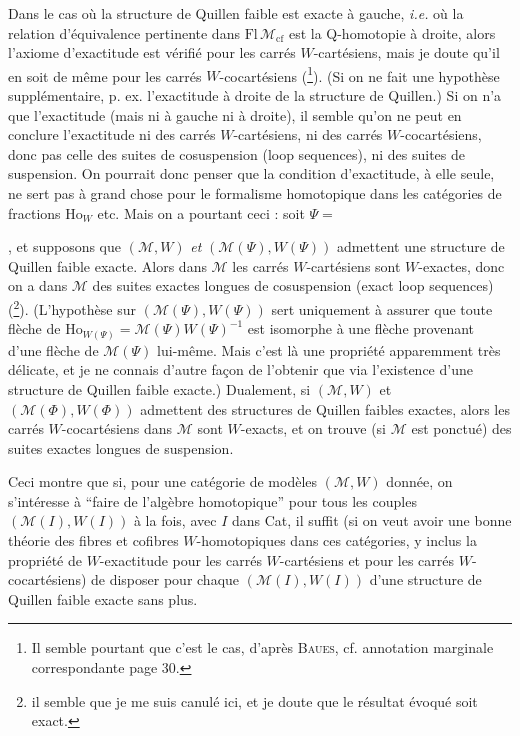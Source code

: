 \documentclass[11pt]{article}
\newcommand{\printedpage}[1]{\marginpar{\footnotesize p.~#1}}
\newcommand{\msp}[1]{\marginpar{\footnotesize [#1]}}
\newcommand{\cM}{\mathcal{M}}
\begin{document}
Dans le cas où la structure de Quillen faible est exacte à gauche, \textit{i.e.} où la relation d'équivalence pertinente dans $\mathrm{Fl}\,\cM_{\mathrm{cf}}$ est la Q-homotopie à droite, alors l'axiome d'exactitude est vérifié pour les carrés $W$-cartésiens, mais je doute qu'il en soit de même pour les carrés $W$-cocartésiens (\footnote{Il semble pourtant que c'est le cas, d'après \textsc{Baues}, cf. annotation marginale correspondante page 30.}). (Si on ne fait une hypothèse supplémentaire, p. ex. l'exactitude à droite de la structure de Quillen.) Si on n'a que l'exactitude (mais ni à gauche ni à droite), il semble qu'on ne peut en conclure l'exactitude ni des carrés $W$-cartésiens, ni des carrés $W$-cocartésiens, donc pas celle des suites de cosuspension (loop sequences), ni des suites de suspension. On pourrait donc penser que la condition d'exactitude, à elle seule, ne sert pas à grand
\msp{page 33}
chose pour le formalisme homotopique dans les catégories de fractions $\mathrm{Ho}_W$ etc. Mais on a pourtant ceci : soit $\Psi = {}$, et supposons que $(\cM,W)$ \textit{et} $(\cM(\Psi),W(\Psi))$ 
\printedpage{20}
 admettent une structure de Quillen faible exacte. Alors dans $\cM$ les carrés $W$-cartésiens sont $W$-exactes, donc on a dans $\cM$ des suites exactes longues de cosuspension (exact loop sequences) (\footnote{il semble que je me suis canulé ici, et je doute que le résultat évoqué soit exact.}). (L'hypothèse sur $(\cM(\Psi),W(\Psi))$ sert uniquement à assurer que toute flèche de $\mathrm{Ho}_{W(\Psi)} = \cM(\Psi)W(\Psi)^{-1}$ est isomorphe à une flèche provenant d'une flèche de $\cM(\Psi)$ lui-même. Mais c'est là une propriété apparemment très délicate, et je ne connais d'autre façon de l'obtenir que via l'existence d'une structure de Quillen faible exacte.) Dualement, si $(\cM,W)$ et $(\cM(\Phi),W(\Phi))$ admettent des structures de Quillen faibles exactes, alors les carrés $W$-cocartésiens dans $\cM$ sont $W$-exacts, et on trouve (si $\cM$ est ponctué) des suites exactes longues de suspension. %

\msp{page 34}
Ceci montre que si, pour une catégorie de modèles $(\cM,W)$ donnée, on s'intéresse à “faire de l'algèbre homotopique” pour tous les couples $(\cM(I),W(I))$ à la fois, avec $I$ dans Cat, il suffit (si on veut avoir une bonne théorie des fibres et cofibres $W$-homotopiques dans ces catégories, y inclus la propriété de $W$-exactitude pour les carrés $W$-cartésiens et pour les carrés $W$-cocartésiens) de disposer pour chaque $(\cM(I),W(I))$ d'une structure de Quillen faible exacte sans plus.
\end{document}
